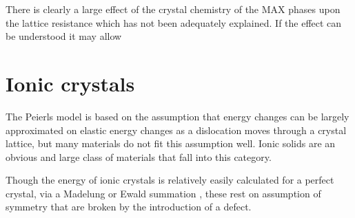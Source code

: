 There is clearly a large effect of the crystal chemistry of the MAX phases upon the lattice resistance which has not been adequately explained. If the effect can be understood it may allow






































\FloatBarrier
\section{Ionic crystals}
\FloatBarrier
\label{sec:ionic_crystals}


The Peierls model is based on the assumption that energy changes can be largely approximated on elastic energy changes as a dislocation moves through a crystal lattice, but many materials do not fit this assumption well. Ionic solids are an obvious and large class of materials that fall into this category.

Though the energy of ionic crystals is relatively easily calculated for a perfect crystal, via a Madelung or Ewald summation \cite{madelung1918,Ewald1921}, these rest on assumption of symmetry that are broken by the introduction of a defect.


